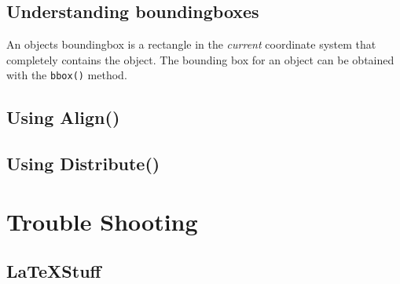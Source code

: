 \documentclass[a4paper]{book}
\begin{document}
\subsection{Understanding boundingboxes}

An objects boundingbox is a rectangle in the \emph{current} coordinate
system that completely contains the object. The bounding box for an object
can be obtained with the \Verb|bbox()| method.

\subsection{Using Align()}

\subsection{Using Distribute()}

\section{Trouble Shooting}

\subsection{\LaTeX Stuff}
\end{document}
